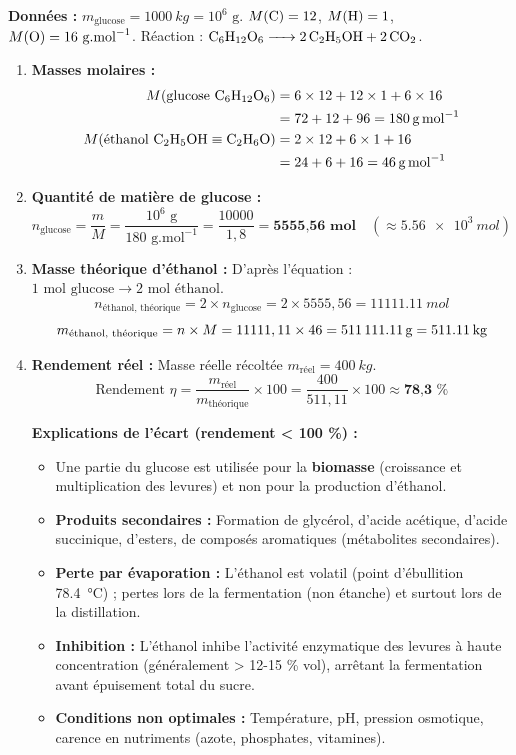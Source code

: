 \documentclass[11pt]{article}
\begin{document}
\begin{corrige}
\textbf{Données :} $m_{\text{glucose}} = \SI{1000}{kg} = 10^6 \text{ g}$.
$M(\ce{C}) = 12$, $M(\ce{H}) = 1$, $M(\ce{O}) = 16 \text{ g.mol}^{-1}$.
Réaction : $\ce{C6H12O6 -> 2 C2H5OH + 2 CO2}$.

\begin{enumerate}
\item \textbf{Masses molaires :}
\begin{align*}
M(\text{glucose } \ce{C6H12O6}) &= 6\times12 + 12\times1 + 6\times16 \\
&= 72 + 12 + 96 = \textbf{\SI{180}{g.mol^{-1}}} \\
M(\text{éthanol } \ce{C2H5OH} \equiv \ce{C2H6O}) &= 2\times12 + 6\times1 + 16 \\
&= 24 + 6 + 16 = \textbf{\SI{46}{g.mol^{-1}}}
\end{align*}

\item \textbf{Quantité de matière de glucose :}
\[ n_{\text{glucose}} = \frac{m}{M} = \frac{10^6 \text{ g}}{180 \text{ g.mol}^{-1}} = \frac{10000}{{1,8}} = \textbf{5555,56 mol} \quad (\approx \SI{5,56e3}{mol}) \]

\item \textbf{Masse théorique d'éthanol :}
D'après l'équation : $1 \text{ mol glucose} \rightarrow 2 \text{ mol éthanol}$.
\[ n_{\text{éthanol, théorique}} = 2 \times n_{\text{glucose}} = 2 \times 5555,56 = \SI{11111,11}{mol} \]
\[ m_{\text{éthanol, théorique}} = n \times M = 11111,11 \times 46 = \SI{511111,11}{g} = \textbf{\SI{511,11}{kg}} \]

\item \textbf{Rendement réel :}
Masse réelle récoltée $m_{\text{réel}} = \SI{400}{kg}$.
\[ \text{Rendement } \eta = \frac{m_{\text{réel}}}{m_{\text{théorique}}} \times 100 = \frac{400}{511,11} \times 100 \approx \textbf{78,3 \%} \]

\textbf{Explications de l'écart (rendement < 100 \%) :}
\begin{itemize}
\item Une partie du glucose est utilisée pour la \textbf{biomasse} (croissance et multiplication des levures) et non pour la production d'éthanol.
\item \textbf{Produits secondaires :} Formation de glycérol, d'acide acétique, d'acide succinique, d'esters, de composés aromatiques (métabolites secondaires).
\item \textbf{Perte par évaporation :} L'éthanol est volatil (point d'ébullition \SI{78,4}{\celsius}) ; pertes lors de la fermentation (non étanche) et surtout lors de la distillation.
\item \textbf{Inhibition :} L'éthanol inhibe l'activité enzymatique des levures à haute concentration (généralement > 12-15 \% vol), arrêtant la fermentation avant épuisement total du sucre.
\item \textbf{Conditions non optimales :} Température, pH, pression osmotique, carence en nutriments (azote, phosphates, vitamines).
\end{itemize}
\end{enumerate}
\end{corrige}
\end{document}
